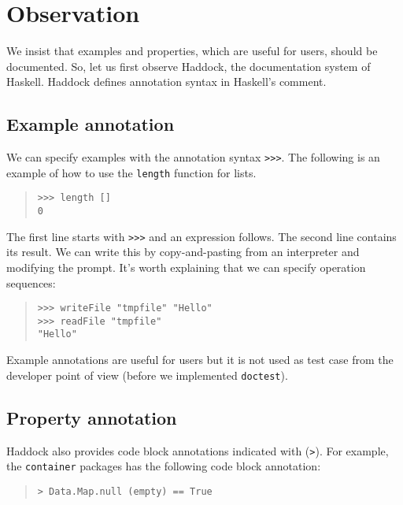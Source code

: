 \documentclass[preprint]{sigplanconf}
\begin{document}
\section{Observation}

We insist that examples and properties, which are useful for users, should be
documented.
So, let us first observe Haddock, the documentation system of Haskell. Haddock defines annotation syntax in Haskell's comment.

\subsection{Example annotation}

We can specify examples with the annotation syntax {\tt >>>}.
The following is an example of how to use the {\tt length} function
for lists.

\begin{quote}
\begin{verbatim}
>>> length []
0
\end{verbatim}
\end{quote}

\noindent The first line starts with {\tt >>>} and an expression follows. The second line contains its result. We can write this by copy-and-pasting from an interpreter and modifying the prompt.
It's worth explaining that we can specify operation sequences:

\begin{quote}
\begin{verbatim}
>>> writeFile "tmpfile" "Hello"
>>> readFile "tmpfile"
"Hello"
\end{verbatim}
\end{quote}

\noindent Example annotations are useful for users but 
it is not used as test case from the developer point of view (before we implemented {\tt doctest}).

\subsection{Property annotation}

Haddock also provides code block annotations indicated with ({\tt >}).
For example, the {\tt container} packages has the following code block annotation:

\begin{quote}
\begin{verbatim}
> Data.Map.null (empty) == True
\end{verbatim}
\end{quote}
\end{document}
